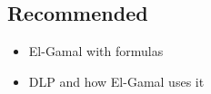 
\subsection{Recommended}
\begin{itemize}
\item El-Gamal with formulas
\item DLP and how El-Gamal uses it
\end{itemize}
